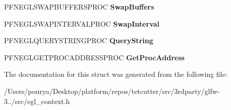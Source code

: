 \begin{DoxyCompactItemize}
\item 
\hypertarget{struct__GLFWlibraryEGL_af226ffb59a555618f77dfd6ddd7d8cfb}{}P\+F\+N\+E\+G\+L\+S\+W\+A\+P\+B\+U\+F\+F\+E\+R\+S\+P\+R\+O\+C {\bfseries Swap\+Buffers}\label{struct__GLFWlibraryEGL_af226ffb59a555618f77dfd6ddd7d8cfb}

\item 
\hypertarget{struct__GLFWlibraryEGL_ae6b1de1994466b2f56f641a5605f60df}{}P\+F\+N\+E\+G\+L\+S\+W\+A\+P\+I\+N\+T\+E\+R\+V\+A\+L\+P\+R\+O\+C {\bfseries Swap\+Interval}\label{struct__GLFWlibraryEGL_ae6b1de1994466b2f56f641a5605f60df}

\item 
\hypertarget{struct__GLFWlibraryEGL_a81b5ad6f25f18accff70c149a179794c}{}P\+F\+N\+E\+G\+L\+Q\+U\+E\+R\+Y\+S\+T\+R\+I\+N\+G\+P\+R\+O\+C {\bfseries Query\+String}\label{struct__GLFWlibraryEGL_a81b5ad6f25f18accff70c149a179794c}

\item 
\hypertarget{struct__GLFWlibraryEGL_a32b102f60afcee8897e9305470a2f44d}{}P\+F\+N\+E\+G\+L\+G\+E\+T\+P\+R\+O\+C\+A\+D\+D\+R\+E\+S\+S\+P\+R\+O\+C {\bfseries Get\+Proc\+Address}\label{struct__GLFWlibraryEGL_a32b102f60afcee8897e9305470a2f44d}

\end{DoxyCompactItemize}


The documentation for this struct was generated from the following file\+:\begin{DoxyCompactItemize}
\item 
/\+Users/pourya/\+Desktop/platform/repos/tetcutter/src/3rdparty/glfw-\/3../src/egl\+\_\+context.\+h\end{DoxyCompactItemize}
